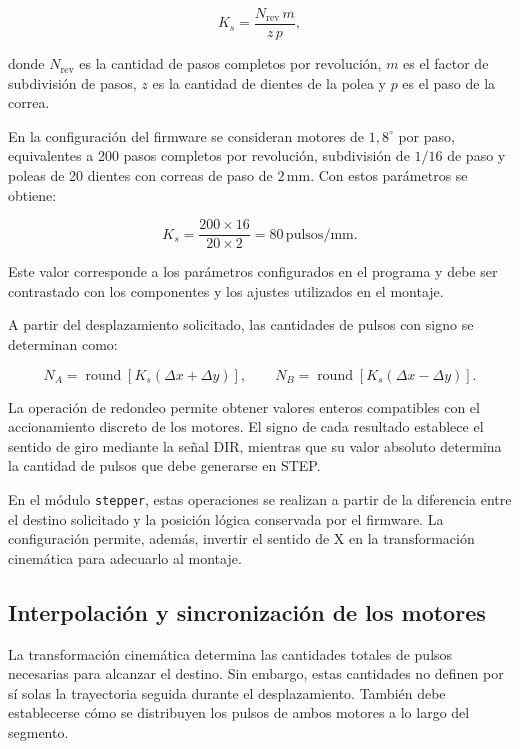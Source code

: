 \documentclass[blue,fullpaper]{ludusofficial}  %
\begin{document}
\begin{equation}
    K_s =
    \frac{N_{\mathrm{rev}}\,m}{z\,p},
    \label{eq:pulsos-por-milimetro}
\end{equation}

donde $N_{\mathrm{rev}}$ es la cantidad de pasos
completos por revolución, $m$ es el factor de
subdivisión de pasos, $z$ es la cantidad de dientes
de la polea y $p$ es el paso de la correa.

En la configuración del firmware se consideran
motores de $1{,}8^\circ$ por paso, equivalentes
a 200 pasos completos por revolución, subdivisión
de $1/16$ de paso y poleas de 20 dientes con correas
de paso de $2\,\mathrm{mm}$. Con estos parámetros
se obtiene:

\begin{equation}
    K_s =
    \frac{200 \times 16}{20 \times 2}
    = 80\,\mathrm{pulsos/mm}.
\end{equation}

Este valor corresponde a los parámetros configurados
en el programa y debe ser contrastado con los
componentes y los ajustes utilizados en el montaje.

A partir del desplazamiento solicitado, las cantidades
de pulsos con signo se determinan como:

\begin{equation}
    N_A =
    \operatorname{round}
    \left[K_s(\Delta x + \Delta y)\right],
    \qquad
    N_B =
    \operatorname{round}
    \left[K_s(\Delta x - \Delta y)\right].
    \label{eq:pulsos-corexy}
\end{equation}

La operación de redondeo permite obtener valores
enteros compatibles con el accionamiento discreto
de los motores. El signo de cada resultado establece
el sentido de giro mediante la señal DIR, mientras
que su valor absoluto determina la cantidad
de pulsos que debe generarse en STEP.

En el módulo \texttt{stepper}, estas operaciones
se realizan a partir de la diferencia entre el
destino solicitado y la posición lógica conservada
por el firmware. La configuración permite, además,
invertir el sentido de X en la transformación
cinemática para adecuarlo al montaje.

\subsection{Interpolación y sincronización de los motores}

La transformación cinemática determina las cantidades
totales de pulsos necesarias para alcanzar el destino.
Sin embargo, estas cantidades no definen por sí solas
la trayectoria seguida durante el desplazamiento.
También debe establecerse cómo se distribuyen
los pulsos de ambos motores a lo largo del segmento.
\end{document}
